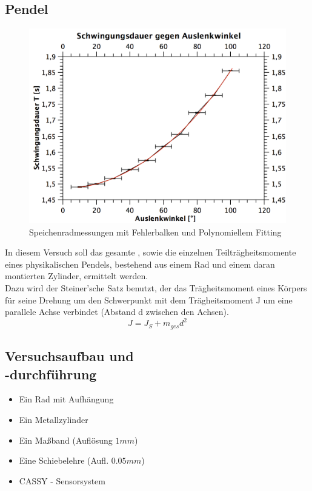 \documentclass[12pt,a4paper]{article}
\begin{document}
\begin{multicols}{2}


\section{Pendel}
\begin{figure}[H]
	\centering
  	\includegraphics[scale=0.45]{./figure/speichenrad_fit_error.png}
	\caption{Speichenradmessungen mit Fehlerbalken und Polynomiellem Fitting}
	\label{fig:rad_fit}
\end{figure}
\noindent
In diesem Versuch soll das gesamte , sowie die einzelnen Teilträgheitsmomente eines physikalischen Pendels, bestehend aus einem Rad und einem daran montierten Zylinder, ermittelt werden.\\
Dazu wird der Steiner'sche Satz benutzt, der das Trägheitsmoment eines Körpers für seine Drehung um den Schwerpunkt mit dem Trägheitsmoment J um eine parallele Achse verbindet (Abstand d zwischen den Achsen).\\
$$ J = J_{S} + m_{ges}d^2 $$

\subsection{Versuchsaufbau und \\-durchführung}

\begin{itemize}
	\item Ein Rad mit Aufhängung
	\item Ein Metallzylinder
	\item Ein Maßband (Auflösung $1 mm$)
	\item Eine Schiebelehre (Aufl. $0.05mm$)
	\item CASSY - Sensorsystem
\end{itemize}


\end{multicols}
\end{document}
